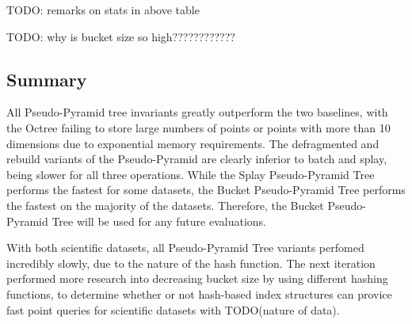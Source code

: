 TODO: remarks on stats in above table

TODO: why is bucket size so high????????????

\subsection{Summary}

All Pseudo-Pyramid tree invariants greatly outperform the two baselines, with the Octree failing to store large numbers of points or points with more than 10 dimensions due to exponential memory requirements. The defragmented and rebuild variants of the Pseudo-Pyramid are clearly inferior to batch and splay, being slower for all three operations. While the Splay Pseudo-Pyramid Tree performs the fastest for some datasets, the Bucket Pseudo-Pyramid Tree performs the fastest on the majority of the datasets. Therefore, the Bucket Pseudo-Pyramid Tree will be used for any future evaluations.

With both scientific datasets, all Pseudo-Pyramid Tree variants perfomed incredibly slowly, due to the nature of the hash function. The next iteration performed more research into decreasing bucket size by using different hashing functions, to determine whether or not hash-based index structures can provice fast point queries for scientific datasets with TODO(nature of data).